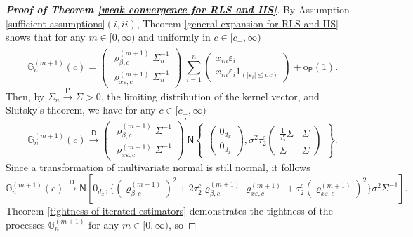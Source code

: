 \documentclass[11pt, letterpaper]{article}
\numberwithin{algorithm}{section}
\numberwithin{assumption}{section}
\numberwithin{lemma}{section}
\numberwithin{theorem}{section}
\numberwithin{corollary}{section}
\numberwithin{remark}{section}
\numberwithin{equation}{section}
\numberwithin{figure}{section}
\numberwithin{table}{section}
\begin{document}
\begin{proof}[\textnormal{\textbf{Proof of Theorem \ref{weak convergence for RLS and IIS}}}]
By Assumption \ref{sufficient assumptions}$(i, ii)$, Theorem \ref{general expansion for RLS and IIS}
shows that for any $m \in [0, \infty)$ and uniformly in $c \in [c_{+}, \infty)$
\begin{equation*}
\mathbb{G}_{n}^{(m + 1)}(c) =
\begin{pmatrix}
\varrho_{\beta, c}^{(m + 1)} \Sigma_{n}^{-1} \\
\varrho_{x \varepsilon, c}^{(m + 1)} \Sigma_{n}^{-1}
\end{pmatrix}^{\prime}
\sum_{i = 1}^{n}
\begin{pmatrix}
x_{in} \varepsilon_{i} \\
x_{in} \varepsilon_{i} 1_{(|\varepsilon_{i}| \le \sigma c)}
\end{pmatrix}
+ \mathrm{o}_{\mathsf{P}}(1).
\end{equation*}
Then, by $\Sigma_{n} \overset{\mathsf{P}}{\to} \Sigma > 0$, the limiting distribution of the kernel vector, and Slutsky's theorem, we have for any $c \in [c_{+}, \infty)$
\begin{equation*}
\mathbb{G}_{n}^{(m + 1)}(c) \overset{\mathsf{D}}{\to}
\begin{pmatrix}
\varrho_{\beta, c}^{(m + 1)} \Sigma^{-1} \\
\varrho_{x \varepsilon, c}^{(m + 1)} \Sigma^{-1}
\end{pmatrix}^{\prime}
\mathsf{N}
\begin{Bmatrix}
\begin{pmatrix}
0_{d_{x}} \\
0_{d_{x}}
\end{pmatrix}
,
\sigma^{2} \tau_{2}^{c}
\begin{pmatrix}
\frac{1}{\tau_{2}^{c}} \Sigma & \Sigma \\
\Sigma & \Sigma
\end{pmatrix}
\end{Bmatrix}.
\end{equation*}
Since a transformation of multivariate normal is still normal, it follows
\begin{equation*}
\mathbb{G}_{n}^{(m + 1)}(c) \overset{\mathsf{D}}{\to} \mathsf{N} [0_{d_{x}}, \{ (\varrho_{\beta, c}^{(m + 1)})^{2} + 2 \tau_{2}^{c} \varrho_{\beta, c}^{(m + 1)} \varrho_{x \varepsilon, c}^{(m + 1)} + \tau_{2}^{c} (\varrho_{x \varepsilon, c}^{(m + 1)})^{2} \} \sigma^{2} \Sigma^{-1}].
\end{equation*}
Theorem \ref{tightness of iterated estimators} demonstrates the tightness of the processes $\mathbb{G}_{n}^{(m + 1)}$ for any $m \in [0, \infty)$, so

\end{proof}
\end{document}
